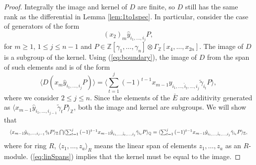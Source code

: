 \documentclass{article}
\theoremstyle{plain}
\theoremstyle{definition}
\numberwithin{thm}{section}
\begin{document}
\begin{proof}
				Integrally the image and kernel of $D$ are finite, so $D$ still has the same rank as the differential in Lemma \ref{lem:1to1spec}.
				In particular, consider the case of generators of the form
				\begin{equation*}
					(x_2)_m\hat{y}_{i_1,\dots,i_j}P,
				\end{equation*}
				for $m\geq 1$, $1\leq j\leq n-1$ and
				$P\in\mathbb{Z}[{\gamma}_1,\dots,{\gamma}_n]\otimes\Gamma_\mathbb{Z}[x_4,\dots,x_{2n}]$.
				The image of $D$ is a subgroup of the kernel.
				Using (\ref{eq:boundary}), 
				the image of $D$ from the span of such elements and is of the form
				\begin{equation}\label{eq:ImageSpan}
					\langle D(x_m\hat{y}_{i_1,\dots,i_j}P) \rangle
					=\langle\sum_{t=1}^j{(-1)^{t-1}x_{m-1}\hat{y}_{i_1,\dots,\hat{i}_t,\dots,i_j}\tilde{\gamma}_{i_t}P}\rangle,
				\end{equation}
				where we consider $2\leq j\leq n$.
				Since the elements of the $\bar{E}$ are additivity generated as
				$\langle x_{m-1}\hat{y}_{i_1,\dots,i_{j-1}}\tilde{\gamma}_tP \rangle_{\mathbb{Z}}$,
				both the image and kernel are subgroups.
				We will show that
				\begin{equation}\label{eq:linSpans}
				\resizebox{1\hsize}{!}{$
					\langle x_{m-1}\hat{y}_{i_1,\dots,i_{j-1}}\tilde{\gamma}_tP \rangle_{\mathbb{Z}}
					\bigcap
					\langle\sum_{t=1}^j{(-1)^{t-1}x_{m-1}\hat{y}_{i_1,\dots,\hat{i}_t,\dots,i_j}\tilde{\gamma}_{i_t}P}\rangle_{\mathbb{Q}}
					=
					\langle\sum_{t=1}^j{(-1)^{t-1}x_{m-1}\hat{y}_{i_1,\dots,\hat{i}_t,\dots,i_j}\tilde{\gamma}_{i_t}P}\rangle_{\mathbb{Z}},$}
				\end{equation}
				where for ring $R$, $\langle z_1,\dots,z_a \rangle_{R}$ means the linear span of elements $z_1,\dots,z_a$ as an $R$-module. 
				(\ref{eq:linSpans}) implies that the kernel must be equal to the image.
				

\end{proof}
\end{document}
